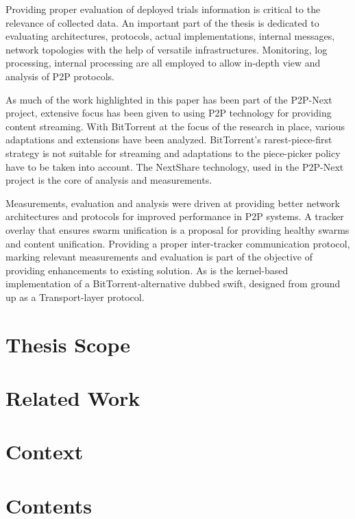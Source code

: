 Providing proper evaluation of deployed trials information is critical to the
relevance of collected data. An important part of the thesis is dedicated to
evaluating architectures, protocols, actual implementations, internal
messages, network topologies with the help of versatile infrastructures.
Monitoring, log processing, internal processing are all employed to allow
in-depth view and analysis of P2P protocols.

As much of the work highlighted in this paper has been part of the
P2P-Next project, extensive focus has been given to using P2P technology for
providing content streaming. With BitTorrent at the focus of the research in
place, various adaptations and extensions have been analyzed. BitTorrent's
rarest-piece-first strategy is not suitable for streaming and adaptations to
the piece-picker policy have to be taken into account. The NextShare
technology, used in the P2P-Next project is the core of analysis and
measurements.

Measurements, evaluation and analysis were driven at providing better network
architectures and protocols for improved performance in P2P systems. A tracker
overlay that ensures swarm unification is a proposal for providing healthy
swarms and content unification. Providing a proper inter-tracker communication
protocol, marking relevant measurements and evaluation is part of the objective
of providing enhancements to existing solution. As is the kernel-based
implementation of a BitTorrent-alternative dubbed swift, designed from ground
up as a Transport-layer protocol.

\section{Thesis Scope}
\label{sec:intro:scope}


\section{Related Work}
\label{sec:intro:related}


\section{Context}
\label{sec:intro:context}


\section{Contents}
\label{sec:intro:contents}

